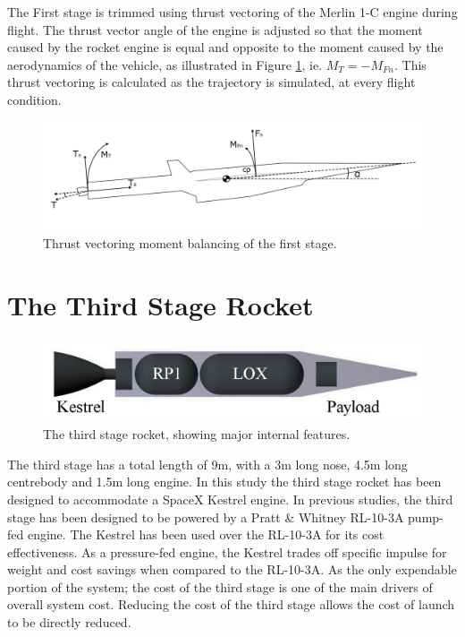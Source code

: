   The First stage is trimmed using thrust vectoring of the Merlin 1-C engine during flight. The thrust vector angle of the engine is adjusted so that the moment caused by the rocket engine is equal and opposite to the moment caused by the aerodynamics of the vehicle, as illustrated in Figure \ref{fig:FirstStageThrustVec}, ie. $M_T = -M_{Fn}$.
  This thrust vectoring is calculated as the trajectory is simulated, at every flight condition. 
 

\begin{figure}
\centering
\includegraphics[width=0.9\linewidth]{figures/3_vehicle_design/FirstStageThrustVec}
\caption{Thrust vectoring moment balancing of the first stage. }
\label{fig:FirstStageThrustVec}
\end{figure}
  
  
  



	

	\section{The Third Stage Rocket}\label{sec:ThirdStageBaseline}
	
	\begin{figure}
\centering
\includegraphics[width=0.7\linewidth]{figures/3_vehicle_design/3rdStage}
\caption{The third stage rocket, showing major internal features.}
\label{fig:3rdStage}
\end{figure}
	
	
	The third stage has a total length of 9m, with a 3m long nose, 4.5m long centrebody and 1.5m long engine.
	In this study the third stage rocket has been designed to accommodate a SpaceX Kestrel engine. In previous studies, the third stage has been designed to be powered by a Pratt \& Whitney RL-10-3A pump-fed engine. The Kestrel has been used over the RL-10-3A for its cost effectiveness. As a pressure-fed engine, the Kestrel trades off specific impulse for weight and cost savings when compared to the RL-10-3A. As the only expendable portion of the system; the cost of the third stage is one of the main drivers of overall system cost. Reducing the cost of the third stage allows the cost of launch to be directly reduced. 
	
